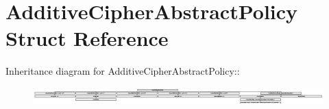 \hypertarget{struct_additive_cipher_abstract_policy}{
\section{AdditiveCipherAbstractPolicy Struct Reference}
\label{struct_additive_cipher_abstract_policy}
}
Inheritance diagram for AdditiveCipherAbstractPolicy::\begin{figure}[H]
\begin{center}
\leavevmode
\includegraphics[height=0.672269cm]{struct_additive_cipher_abstract_policy}
\end{center}
\end{figure}
